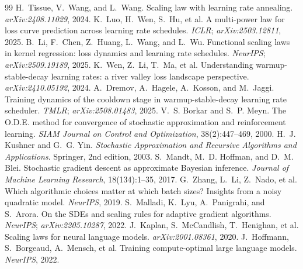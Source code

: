 \documentclass{article}
\begin{document}
{\small
\begin{thebibliography}{99}
 H.~Tissue, V.~Wang, and L.~Wang. Scaling law with learning rate annealing. \emph{arXiv:2408.11029}, 2024.
 K.~Luo, H.~Wen, S.~Hu, et al. A multi-power law for loss curve prediction across learning rate schedules. \emph{ICLR}; \emph{arXiv:2503.12811}, 2025.
 B.~Li, F.~Chen, Z.~Huang, L.~Wang, and L.~Wu. Functional scaling laws in kernel regression: loss dynamics and learning rate schedules. \emph{NeurIPS}; \emph{arXiv:2509.19189}, 2025.
 K.~Wen, Z.~Li, T.~Ma, et al. Understanding warmup-stable-decay learning rates: a river valley loss landscape perspective. \emph{arXiv:2410.05192}, 2024.
 A.~Dremov, A.~Hagele, A.~Kosson, and M.~Jaggi. Training dynamics of the cooldown stage in warmup-stable-decay learning rate scheduler. \emph{TMLR}; \emph{arXiv:2508.01483}, 2025.
 V.~S. Borkar and S.~P. Meyn. The O.D.E. method for convergence of stochastic approximation and reinforcement learning. \emph{SIAM Journal on Control and Optimization}, 38(2):447--469, 2000.
 H.~J. Kushner and G.~G. Yin. \emph{Stochastic Approximation and Recursive Algorithms and Applications}. Springer, 2nd edition, 2003.
 S.~Mandt, M.~D. Hoffman, and D.~M. Blei. Stochastic gradient descent as approximate Bayesian inference. \emph{Journal of Machine Learning Research}, 18(134):1--35, 2017.
 G.~Zhang, L.~Li, Z.~Nado, et al. Which algorithmic choices matter at which batch sizes? Insights from a noisy quadratic model. \emph{NeurIPS}, 2019.
 S.~Malladi, K.~Lyu, A.~Panigrahi, and S.~Arora. On the SDEs and scaling rules for adaptive gradient algorithms. \emph{NeurIPS}; \emph{arXiv:2205.10287}, 2022.
 J.~Kaplan, S.~McCandlish, T.~Henighan, et al. Scaling laws for neural language models. \emph{arXiv:2001.08361}, 2020.
 J.~Hoffmann, S.~Borgeaud, A.~Mensch, et al. Training compute-optimal large language models. \emph{NeurIPS}, 2022.
\end{thebibliography}
}
\end{document}
